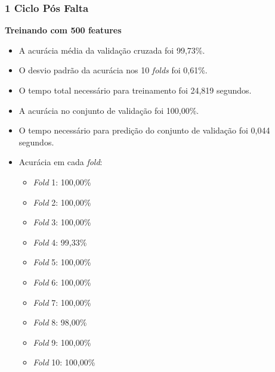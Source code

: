 \subsubsection{1 Ciclo Pós Falta}
\textbf{Treinando com 500 features}
\begin{itemize}
    \item A acurácia média da validação cruzada foi 99,73\%.
    \item O desvio padrão da acurácia nos 10 \textit{folds} foi 0,61\%.
    \item O tempo total necessário para treinamento foi 24,819 segundos.
    \item A acurácia no conjunto de validação foi 100,00\%.
    \item O tempo necessário para predição do conjunto de validação foi 0,044 segundos.
    \item Acurácia em cada \textit{fold}:
    \begin{itemize}
        \item \textit{Fold} 1: 100,00\%
        \item \textit{Fold} 2: 100,00\%
        \item \textit{Fold} 3: 100,00\%
        \item \textit{Fold} 4: 99,33\%
        \item \textit{Fold} 5: 100,00\%
        \item \textit{Fold} 6: 100,00\%
        \item \textit{Fold} 7: 100,00\%
        \item \textit{Fold} 8: 98,00\%
        \item \textit{Fold} 9: 100,00\%
        \item \textit{Fold} 10: 100,00\%
    \end{itemize}
\end{itemize}

